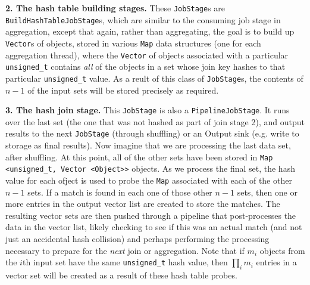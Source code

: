 \vspace{5pt}
{\bf 2. The hash table building stages.} These \texttt{JobStage}s are
\texttt{BuildHashTableJobStage}s, which are similar to the consuming job stage in aggregation, 
except that again, rather than aggregating, the goal is to build up \texttt{Vector}s of objects, stored in various \texttt{Map} data structures (one for each
aggregation thread), where the \texttt{Vector} of objects associated with a particular 
\texttt{unsigned\_t} contains \emph{all} of the objects in a set whose join key hashes to that particular \texttt{unsigned\_t} value.
As a reult of this class of \texttt{JobStage}s, the contents of $n - 1$ of the input sets will be stored precisely as required.

\vspace{5pt}
{\bf 3. The hash join stage.} 
This \texttt{JobStage} is also a \texttt{PipelineJobStage}. It runs over the last set (the one that was not 
hashed as part of join stage 2), and output results to the next
\texttt{JobStage} (through shuffling) or an Output sink (e.g. write to storage
as final results). Now imagine that we are processing the last data set, after shuffling.  At this point,
all of the other sets have been
stored in \texttt{Map <unsigned\_t, Vector <Object}\texttt{>}\texttt{>} objects.  As we process the final set,
the hash value for each ofject is used to probe the \texttt{Map}
associated with each of the other $n-1$ sets.  If a match is found in each one of those other $n-1$ sets, then
one or more entries in the output vector list are created to store the matches.  The resulting vector sets are then pushed through a pipeline that post-processes
the data in the vector list, likely checking to see if this was an actual match (and not just an accidental hash collision) and perhaps performing the processing
necessary to prepare for the \emph{next} join or aggregation.
Note that if $m_i$ objects from the $i$th input set have the same \texttt{unsigned\_t} hash value, then $\prod_i m_i$ entries in a vector set will be created
as a result of these hash table probes. 

